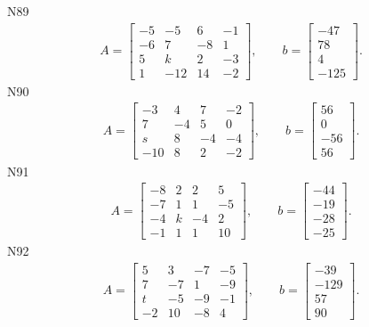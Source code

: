 \documentclass[11pt]{report}
\begin{document}
N89
\begin{align*}
 A = \left[\begin{matrix}-5 & -5 & 6 & -1\\-6 & 7 & -8 & 1\\5 & k & 2 & -3\\1 & -12 & 14 & -2\end{matrix}\right],
\qquad b = \left[\begin{matrix}-47\\78\\4\\-125\end{matrix}\right]. 
 \end{align*}
N90
\begin{align*}
 A = \left[\begin{matrix}-3 & 4 & 7 & -2\\7 & -4 & 5 & 0\\s & 8 & -4 & -4\\-10 & 8 & 2 & -2\end{matrix}\right],
\qquad b = \left[\begin{matrix}56\\0\\-56\\56\end{matrix}\right]. 
 \end{align*}
N91
\begin{align*}
 A = \left[\begin{matrix}-8 & 2 & 2 & 5\\-7 & 1 & 1 & -5\\-4 & k & -4 & 2\\-1 & 1 & 1 & 10\end{matrix}\right],
\qquad b = \left[\begin{matrix}-44\\-19\\-28\\-25\end{matrix}\right]. 
 \end{align*}
N92
\begin{align*}
 A = \left[\begin{matrix}5 & 3 & -7 & -5\\7 & -7 & 1 & -9\\t & -5 & -9 & -1\\-2 & 10 & -8 & 4\end{matrix}\right],
\qquad b = \left[\begin{matrix}-39\\-129\\57\\90\end{matrix}\right]. 
 \end{align*}
\end{document}
